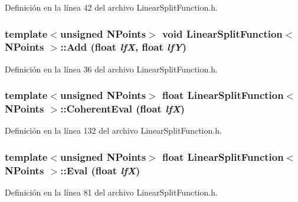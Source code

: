 Definición en la línea 42 del archivo LinearSplitFunction.h.

\hypertarget{class_linear_split_function_abec17acb5ee65d4ea0c4c07d269c1354}{
\subsubsection[{Add}]{\setlength{\rightskip}{0pt plus 5cm}template$<$unsigned NPoints$>$ void {\bf LinearSplitFunction}$<$ NPoints $>$::Add (float {\em lfX}, \/  float {\em lfY})}}
\label{class_linear_split_function_abec17acb5ee65d4ea0c4c07d269c1354}


Definición en la línea 36 del archivo LinearSplitFunction.h.

\hypertarget{class_linear_split_function_ac3ea5d15dbb6b961d31646107ca8b4c9}{
\subsubsection[{CoherentEval}]{\setlength{\rightskip}{0pt plus 5cm}template$<$unsigned NPoints$>$ float {\bf LinearSplitFunction}$<$ NPoints $>$::CoherentEval (float {\em lfX})}}
\label{class_linear_split_function_ac3ea5d15dbb6b961d31646107ca8b4c9}


Definición en la línea 132 del archivo LinearSplitFunction.h.

\hypertarget{class_linear_split_function_ad013823a7004d6ed710feab0570cdcb1}{
\subsubsection[{Eval}]{\setlength{\rightskip}{0pt plus 5cm}template$<$unsigned NPoints$>$ float {\bf LinearSplitFunction}$<$ NPoints $>$::Eval (float {\em lfX})}}
\label{class_linear_split_function_ad013823a7004d6ed710feab0570cdcb1}


Definición en la línea 81 del archivo LinearSplitFunction.h.

